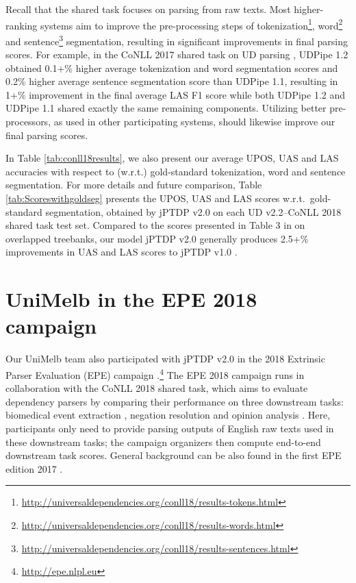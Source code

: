 \documentclass[11pt,letterpaper]{article}
\begin{document}
 Recall that the shared task focuses on parsing from raw texts.  
 Most higher-ranking systems aim to improve the pre-processing steps of tokenization\footnote{\url{http://universaldependencies.org/conll18/results-tokens.html}}, word\footnote{\url{http://universaldependencies.org/conll18/results-words.html}} and sentence\footnote{\url{http://universaldependencies.org/conll18/results-sentences.html}} segmentation, resulting in significant improvements in final parsing scores. For example, in the CoNLL 2017 shared task on UD parsing \citep{K17-3001}, UDPipe 1.2 obtained 0.1+\% higher average tokenization and word segmentation scores and 0.2\% higher average sentence segmentation score than UDPipe 1.1, resulting in 1+\% improvement in the final  average LAS F1 score while both UDPipe 1.2 and UDPipe 1.1  shared exactly the same remaining components.  Utilizing  better pre-processors, as used in other participating systems,  should likewise improve our final parsing scores. 
 
In Table \ref{tab:conll18results}, we also present our average UPOS, UAS and LAS accuracies with respect to (w.r.t.) gold-standard tokenization, word and sentence segmentation. 
For more details and future comparison,   Table \ref{tab:Scoreswithgoldseg}  presents the UPOS, UAS and LAS scores w.r.t.\  gold-standard   segmentation, obtained by  jPTDP v2.0 on each UD v2.2--CoNLL 2018 shared task test
set. Compared to the scores presented in Table 3 in \citet{nguyen-dras-johnson:2017:K17-3}   on overlapped treebanks, our model jPTDP v2.0 generally produces 2.5+\% improvements in UAS and LAS scores to  jPTDP v1.0 \citep{nguyen-dras-johnson:2017:K17-3}.  


\section{UniMelb in the  EPE 2018 campaign}\label{sec:epe}

Our  UniMelb team also participated with jPTDP v2.0 in the 2018 Extrinsic Parser Evaluation (EPE) campaign \citep{epe18}.\footnote{\url{http://epe.nlpl.eu}}  The EPE 2018 campaign runs in collaboration with the CoNLL 2018 shared task, which
aims to evaluate dependency parsers by comparing their performance on three downstream tasks: biomedical  event extraction \cite{Bjo:Gin:Sal:17}, negation resolution \cite{Lap:Oep:Ovr:17} and opinion analysis \cite{Johansson:17}. 
Here, participants only need to provide parsing outputs of English raw texts used in these downstream tasks; the campaign organizers then  compute
end-to-end downstream task scores. 
General background can be also found in the first EPE edition 2017 \citep{epe17}. 
\end{document}

